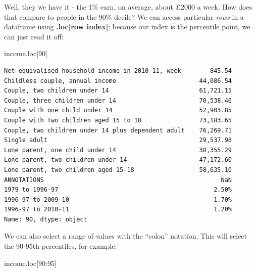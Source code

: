 \documentclass[
  letterpaper,
  DIV=11,
  numbers=noendperiod]{scrreprt}
\newenvironment{Shaded}{\begin{snugshade}}{\end{snugshade}}
\newcommand{\DecValTok}[1]{\textcolor[rgb]{0.68,0.00,0.00}{#1}}
\newcommand{\NormalTok}[1]{\textcolor[rgb]{0.00,0.23,0.31}{#1}}
\begin{document}
Well, they we have it - the 1\% earn, on average, about £2000 a week.
How does that compare to people in the 90\% decile? We can access
particular \emph{rows} in a dataframe using \textbf{.loc{[}row
index{]}}; because our index is the percentile point, we can just read
it off:

\begin{Shaded}
\begin{Highlighting}[]
\NormalTok{income.loc[}\DecValTok{90}\NormalTok{]}
\end{Highlighting}
\end{Shaded}

\begin{verbatim}
Net equivalised household income in 2010-11, week        845.54
Childless couple, annual income                       44,086.54
Couple, two children under 14                         61,721.15
Couple, three children under 14                       70,538.46
Couple with one child under 14                        52,903.85
Couple with two children aged 15 to 18                73,183.65
Couple, two children under 14 plus dependent adult    76,269.71
Single adult                                          29,537.98
Lone parent, one child under 14                       38,355.29
Lone parent, two children under 14                    47,172.60
Lone parent, two children aged 15-18                  58,635.10
ANNOTATIONS                                                 NaN
1979 to 1996-97                                           2.50%
1996-97 to 2009-10                                        1.70%
1996-97 to 2010-11                                        1.20%
Name: 90, dtype: object
\end{verbatim}

We can also select a range of values with the ``colon'' notation. This
will select the 90-95th percentiles, for example:

\begin{Shaded}
\begin{Highlighting}[]
\NormalTok{income.loc[}\DecValTok{90}\NormalTok{:}\DecValTok{95}\NormalTok{]}
\end{Highlighting}
\end{Shaded}
\end{document}
